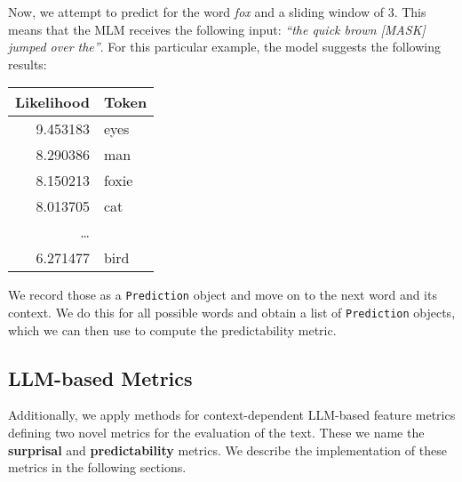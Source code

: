    Now, we attempt to predict for the word \textit{fox} and a sliding window of 3. This means that the MLM receives the following input: \textit{``the quick brown [MASK] jumped over the''}. For this particular example, the model suggests the following results:

    \begin{table}[htbp]
        \centering
          \begin{tabular}{rl}
        \toprule
               Likelihood &       Token \\
        \midrule
        9.453183 &    eyes \\
        8.290386 &     man \\
        8.150213 &   foxie \\
        8.013705 &     cat \\
        \dots \\
        6.271477 &    bird \\
        \bottomrule
        \end{tabular}  
    \end{table}


        We record those as a \texttt{Prediction} object and move on to the next word and its context. We do this for all possible words and obtain a list of \texttt{Prediction} objects, which we can then use to compute the predictability metric.


\subsection*{LLM-based Metrics}\label{sec:llm_metrics}
Additionally, we apply methods for context-dependent LLM-based feature metrics defining two novel metrics for the evaluation of the text. These we name the \textbf{surprisal} and \textbf{predictability} metrics. We describe the implementation of these metrics in the following sections. 


